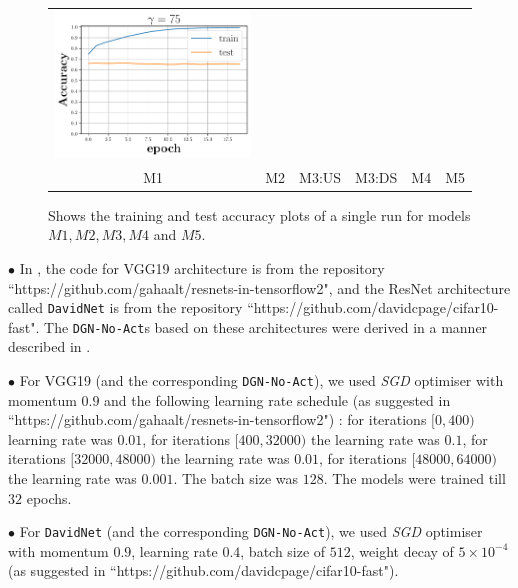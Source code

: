 \begin{figure}[h]
\begin{minipage}{0.99\columnwidth}
{\begin{tabular}{cccccc}
\includegraphics[scale=0.125]{figs/galu_75_recovered.pdf}\\
\tiny{M1}&\tiny{M2}&\tiny{M3:US}&\tiny{M3:DS}&\tiny{M4}&\tiny{M5}\\
\end{tabular}
}
\end{minipage}
\caption{Shows the training and test accuracy plots of a single run for models $M1,M2,M3,M4$ and $M5$.}
\label{fig:rand-label2}
\end{figure}

\indent \quad $\bullet$ In , the code for VGG19 architecture is from the repository ``https://github.com/gahaalt/resnets-in-tensorflow2", and the ResNet architecture called \texttt{DavidNet} is from the repository ``https://github.com/davidcpage/cifar10-fast". The \texttt{DGN-No-Act}s based on these architectures were derived in a manner described in .

\indent \quad $\bullet$ For VGG19 (and the corresponding \texttt{DGN-No-Act}), we used \emph{SGD} optimiser with momentum $0.9$ and the following learning rate schedule (as suggested in ``https://github.com/gahaalt/resnets-in-tensorflow2") : for iterations $[0, 400)$ learning rate was $0.01$,  for iterations $[400, 32000)$ the learning rate was $ 0.1$, for iterations $[32000, 48000)$ the learning rate was $0.01$, for iterations $[48000, 64000)$ the learning rate was $0.001$. The batch size was $128$. The models were trained till $32$ epochs.


\indent \quad $\bullet$ For \texttt{DavidNet} (and the corresponding \texttt{DGN-No-Act}), we used \emph{SGD} optimiser with momentum $0.9$, learning rate $0.4$, batch size of $512$, weight decay of $5\times 10^{-4}$ (as suggested in ``https://github.com/davidcpage/cifar10-fast").





